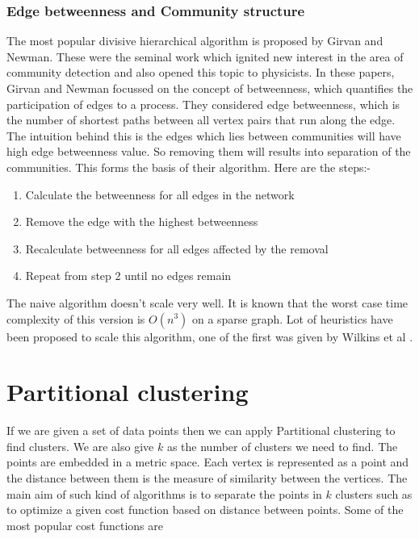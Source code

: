 \documentclass[letterpaper]{article}
\begin{document}
\subsubsection{Edge betweenness and Community structure}
The most popular divisive hierarchical algorithm is proposed by Girvan and
Newman\cite{new2002,new2004}. These were the seminal work which ignited new
interest in the area of community detection and also opened this topic to
physicists. In these papers, Girvan and Newman focussed on the concept of
betweenness, which quantifies the participation of edges to a process. They
considered edge betweenness, which is the number of shortest paths between all
vertex pairs that run along the edge. The intuition behind this is the edges
which lies between communities will have high edge betweenness value. So
removing them will results into separation of the communities. This forms the
basis of their algorithm. Here are the steps:-
\begin{enumerate}
\item Calculate the betweenness for all edges in the network
\item Remove the edge with the highest betweenness
\item Recalculate betweenness for all edges affected by the removal
\item Repeat from step 2 until no edges remain
\end{enumerate}
The naive algorithm doesn't scale very well. It is known that the worst case
time complexity of this version is $O(n^3)$ on a sparse graph. Lot of heuristics have been
proposed to scale this algorithm, one of the first was given by Wilkins et al \cite{wilkin2004}.

\section{Partitional clustering}
If we are given a set of data points then we can apply Partitional clustering
to find clusters.  We are also give $k$ as the number of clusters we need to
find. The points are embedded in a metric space. Each vertex is represented as
a point and the distance between them is the measure of similarity between the
vertices. The main aim of such kind of algorithms is to separate the points in
$k$ clusters such as to optimize a given cost function based on distance
between points. Some of the most popular cost functions are 
\end{document}

